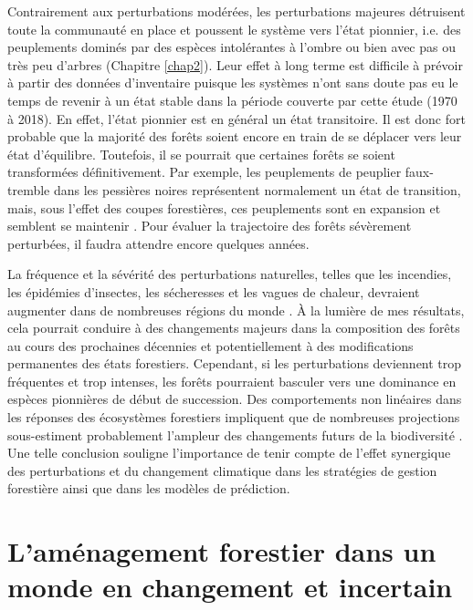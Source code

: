 Contrairement aux perturbations modérées, les perturbations majeures
détruisent toute la communauté en place et poussent le système vers
l'état pionnier, i.e. des peuplements dominés par des espèces
intolérantes à l'ombre ou bien avec pas ou très peu d'arbres (Chapitre
\ref{chap2}). Leur effet à long terme est difficile à prévoir à partir
des données d'inventaire puisque les systèmes n'ont sans doute pas eu le
temps de revenir à un état stable dans la période couverte par cette
étude (1970 à 2018). En effet, l'état pionnier est en général un état
transitoire. Il est donc fort probable que la majorité des forêts soient
encore en train de se déplacer vers leur état d'équilibre. Toutefois, il
se pourrait que certaines forêts se soient transformées définitivement.
Par exemple, les peuplements de peuplier faux-tremble dans les pessières
noires représentent normalement un état de transition, mais, sous
l'effet des coupes forestières, ces peuplements sont en expansion et
semblent se maintenir \citep{grondin_les_2003}. Pour évaluer la
trajectoire des forêts sévèrement perturbées, il faudra attendre encore
quelques années.

La fréquence et la sévérité des perturbations naturelles, telles que les
incendies, les épidémies d'insectes, les sécheresses et les vagues de
chaleur, devraient augmenter dans de nombreuses régions du monde
\citep{bergeron_past_2006, seidl_forest_2017}. À la lumière de mes
résultats, cela pourrait conduire à des changements majeurs dans la
composition des forêts au cours des prochaines décennies et
potentiellement à des modifications permanentes des états forestiers.
Cependant, si les perturbations deviennent trop fréquentes et trop
intenses, les forêts pourraient basculer vers une dominance en espèces
pionnières de début de succession. Des comportements non linéaires dans
les réponses des écosystèmes forestiers impliquent que de nombreuses
projections sous-estiment probablement l'ampleur des changements futurs
de la biodiversité \citep{scheffer_catastrophic_2001}. Une telle
conclusion souligne l'importance de tenir compte de l'effet synergique
des perturbations et du changement climatique dans les stratégies de
gestion forestière ainsi que dans les modèles de prédiction.

\hypertarget{lamuxe9nagement-forestier-dans-un-monde-en-changement-et-incertain}{%
\section{L'aménagement forestier dans un monde en changement et
incertain}\label{lamuxe9nagement-forestier-dans-un-monde-en-changement-et-incertain}}

